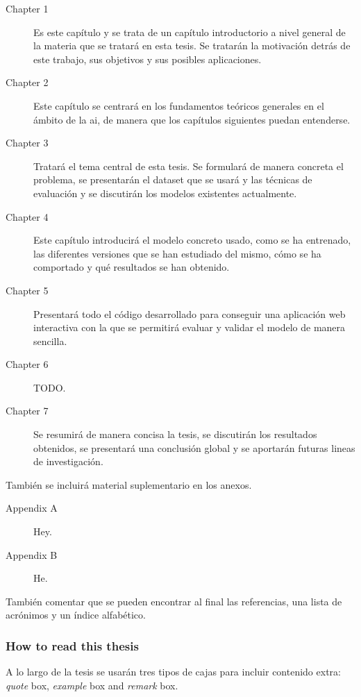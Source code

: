 \begin{description}
  \item[Chapter 1] Es este capítulo y se trata de un capítulo introductorio a
  nivel general de la materia que se tratará en esta tesis. Se tratarán la
  motivación detrás de este trabajo, sus objetivos y sus posibles
  aplicaciones. 
  \item[Chapter 2] Este capítulo se centrará en los fundamentos teóricos
  generales en el ámbito de la \gls{ai}, de manera que los capítulos siguientes
  puedan entenderse. 
  \item[Chapter 3] Tratará el tema central de esta tesis. Se formulará de
  manera concreta el problema, se presentarán el dataset que se usará y las
  técnicas de evaluación y se discutirán los modelos existentes
  actualmente. 
  \item[Chapter 4] Este capítulo introducirá el modelo concreto usado, como se
  ha entrenado, las diferentes versiones que se han estudiado del mismo, cómo
  se ha comportado y qué resultados se han obtenido. 
  \item[Chapter 5] Presentará todo el código desarrollado para conseguir una
  aplicación web interactiva con la que se permitirá evaluar y validar el
  modelo de manera sencilla. 
  \item[Chapter 6] TODO. 
  \item[Chapter 7] Se resumirá de manera concisa la tesis, se discutirán los
  resultados obtenidos, se presentará una conclusión global y se aportarán
  futuras lineas de investigación. 
\end{description}

También se incluirá material suplementario en los anexos.

\begin{description}
  \item[Appendix A] Hey. 
  \item[Appendix B] He. 
\end{description}

También comentar que se pueden encontrar al final las referencias, una lista de
acrónimos y un índice alfabético.

\subsubsection{How to read this thesis}
A lo largo de la tesis se usarán tres tipos de cajas para incluir contenido
extra: \emph{quote} box, \emph{example} box and \emph{remark} box.


